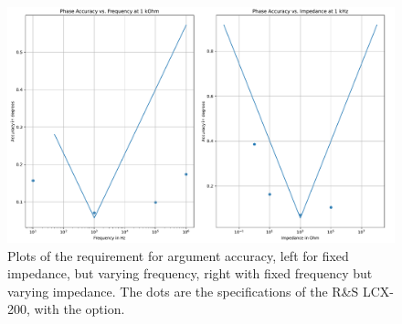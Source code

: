 \begin{figure}[H]
  \centering
  \includegraphics[width=1\textwidth]{Sections/5_SystemRequirements/Figures/PhaseSpec.pdf}
  \caption{Plots of the requirement for argument accuracy, left for fixed impedance, but varying frequency, right with fixed frequency but varying impedance. The dots are the specifications of the R\&S LCX-200, with the  option.}
  \label{fig_5_PhaseAccuracy}
\end{figure}